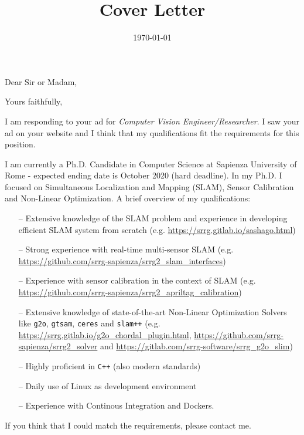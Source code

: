 \documentclass[11pt,a4paper,roman]{moderncv}
\title{Cover Letter}                               %
\begin{document}
\date{\today}
\opening{Dear Sir or Madam,}
\closing{Yours faithfully,}
\makelettertitle

I am responding to your ad for \emph{Computer Vision Engineer/Researcher}.
I saw your ad on your website and I think that my qualifications
fit the requirements for this position.

I am currently a Ph.D. Candidate in Computer Science at Sapienza University of Rome -
expected ending date is October 2020 (hard deadline).
In my Ph.D. I focused on Simultaneous Localization and Mapping (SLAM), Sensor Calibration and
Non-Linear Optimization. A brief overview of my qualifications:

\vspace{10pt}
\begin{itemize}
\item[--] Extensive knowledge of the SLAM problem and
  experience in developing efficient SLAM system from scratch
  (e.g. \url{https://srrg.gitlab.io/sashago.html})
\item[--] Strong experience with real-time multi-sensor SLAM (e.g. \url{https://github.com/srrg-sapienza/srrg2_slam_interfaces})
\item[--] Experience with sensor calibration in the context of SLAM (e.g. \url{https://github.com/srrg-sapienza/srrg2_apriltag_calibration})
\item[--] Extensive knowledge of state-of-the-art Non-Linear Optimization Solvers like \texttt{g2o}, \texttt{gtsam}, \texttt{ceres} and \texttt{slam++}
  (e.g. \url{https://srrg.gitlab.io/g2o_chordal_plugin.html},
  \url{https://github.com/srrg-sapienza/srrg2_solver} and
  \url{https://gitlab.com/srrg-software/srrg_g2o_slim})
\item[--] Highly proficient in \texttt{C++} (also modern standards)
\item[--] Daily use of Linux as development environment
\item[--] Experience with Continous Integration and Dockers.
\end{itemize}
\vspace{10pt}

If you think that I could match the requirements, please contact me.

\makeletterclosing
\end{document}
